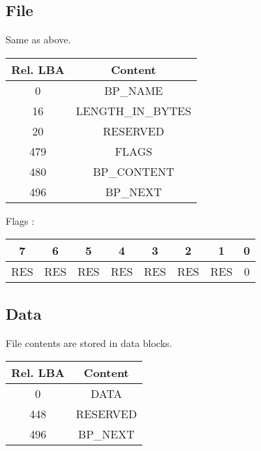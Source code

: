\documentclass{article}
\begin{document}
\subsection{File}
Same as above.
\newline
\begin{tabular}{|c|c|}
  \hline
  Rel. LBA & Content \\
  \hline
  0 & BP\_NAME \\
  \hline
  16 &  LENGTH\_IN\_BYTES \\
  \hline
  20 &  RESERVED \\
  \hline
  479 &  FLAGS \\
  \hline
  480 & BP\_CONTENT \\
  \hline
  496 & BP\_NEXT \\
  \hline
  
\end{tabular}
\newline
Flags :
\begin{tabular}{|c|c|c|c|c|c|c|c|}
  \hline
  7 & 6 & 5 & 4 & 3 & 2 & 1 & 0 \\
  \hline
  RES & RES & RES & RES & RES & RES & RES & 0  \\
  \hline
\end{tabular}
\subsection{Data}
File contents are stored in data blocks.
\newline
\begin{tabular}{|c|c|}
  \hline
  Rel. LBA & Content \\
  \hline
  0 & DATA \\
  \hline
  448 &  RESERVED \\
  \hline
  496 & BP\_NEXT \\
  \hline
  
\end{tabular}
\end{document}
